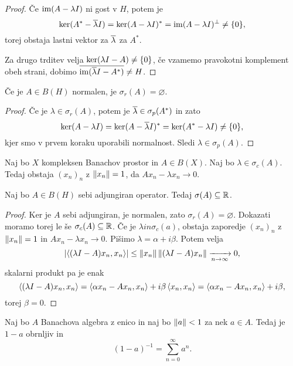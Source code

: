 \begin{proof}
  Če $\operatorname{im}(A - \lambda I)$ ni gost v $H$, potem je
  \[
	\operatorname{ker} (A^* - \overline{\lambda} I)
	= \operatorname{ker} (A - \lambda I)^*
	= \operatorname{im} (A - \lambda I)^\bot
	\ne \{0\},
  \]
  torej obstaja lastni vektor za $\overline{\lambda}$ za $A^*$.

  Za drugo trditev velja $\operatorname{ker} (\lambda I -A) \ne \{0\}$, če vzamemo
  pravokotni komplement obeh strani, dobimo $\overline{\operatorname{im} (\overline{\lambda} I - A^*)}
  \ne H$.
\end{proof}

\begin{posledica}
  Če je $A \in B(H)$ normalen, je $\sigma_r(A) = \varnothing$.
\end{posledica}

\begin{proof}
  Če je $\lambda \in \sigma_r(A)$, potem je $\overline{\lambda} \in \sigma_p(A^*)$
  in zato
  \[
	\operatorname{ker} (A - \lambda I) = \operatorname{ker}(A - \overline{\lambda} I)^*
	= \operatorname{ker}(A^* - \lambda I) \ne \{0\},
  \]
  kjer smo v prvem koraku uporabili normalnost.
  Sledi $\lambda \in \sigma_p(A)$.
  \protislovje{}
\end{proof}

\begin{lema}
  Naj bo $X$ kompleksen Banachov prostor in $A \in B(X)$.
  Naj bo $\lambda \in \sigma_c(A)$.
  Tedaj obstaja $(x_n)_n$ z $\left\lVert x_n\right\rVert = 1$, da $A x_n - \lambda x_n \to 0$.
\end{lema}

\begin{izrek}
  Naj bo $A \in B(H)$ sebi adjungiran operator.
  Tedaj $\sigma(A) \subseteq \mathbb{R}$.
\end{izrek}

\begin{proof}
  Ker je $A$ sebi adjungiran, je normalen, zato $\sigma_r(A) = \varnothing$.
  Dokazati moramo torej le še $\sigma_c(A) \subseteq \mathbb{R}$.
  Če je $\lambda in \sigma_c(a)$, obstaja zaporedje $(x_n)_n$ z $\left\lVert x_n\right\rVert = 1$
  in $A x_n - \lambda x_n \to 0$.
  Pišimo $\lambda = \alpha + i \beta$.
  Potem velja
  \[
	\left| \left< (\lambda I - A) x_n, x_n \right> \right|
	\le \left\lVert x_n\right\rVert \left\lVert(\lambda I - A) x_n\right\rVert
	\xrightarrow[n \to \infty]{} 0,
  \]
  skalarni produkt pa je enak
  \[
	\left< (\lambda I - A) x_n, x_n \right>
	= \left< \alpha x_n - A x_n, x_n \right> + i \beta \left< x_n, x_n \right>
	= \left< \alpha x_n - A x_n, x_n \right> + i \beta,
  \]
  torej $\beta = 0$.
\end{proof}

\begin{izrek}
  Naj bo $A$ Banachova algebra z enico in naj bo $\left\lVert a\right\rVert < 1$ za nek $a \in
  A$.
  Tedaj je $1 - a$ obrnljiv in
  \[
	(1 - a)^{-1} = \sum_{n=0}^\infty a^n.
  \]
\end{izrek}

